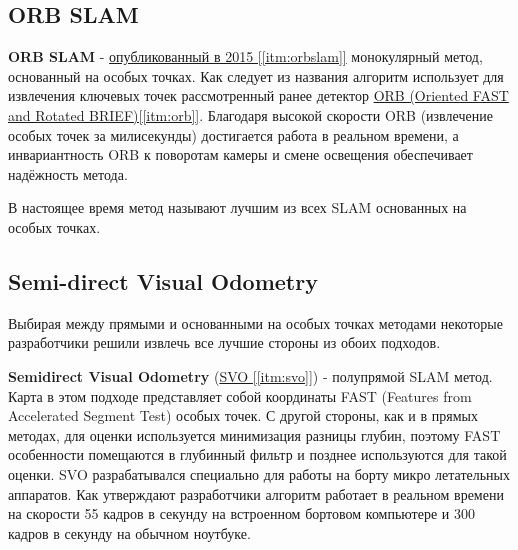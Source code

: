 \subsection{ORB SLAM}
\textbf{ORB SLAM} - \hyperref[itm:orbslam]{опубликованный в 2015 [\ref{itm:orbslam}]} монокулярный метод, основанный на особых точках. Как следует из названия алгоритм использует для извлечения ключевых точек рассмотренный ранее детектор \hyperref[itm:orb]{ORB (Oriented FAST and Rotated BRIEF)[\ref{itm:orb}]}. Благодаря высокой скорости ORB (извлечение особых точек за милисекунды) достигается работа в реальном времени, а инвариантность ORB к поворотам камеры и смене освещения обеспечивает надёжность метода.

В настоящее время метод называют лучшим из всех SLAM основанных на особых точках.

\subsection{Semi-direct Visual Odometry}
Выбирая между прямыми и основанными на особых точках методами некоторые разработчики решили извлечь все лучшие стороны из обоих подходов.

\textbf{Semidirect
Visual Odometry} (\hyperref[itm:svo]{SVO [\ref{itm:svo}]}) - полупрямой SLAM метод. Карта в этом подходе представляет собой координаты FAST (Features from Accelerated Segment Test) особых точек. С другой стороны, как и в прямых методах, для оценки используется минимизация разницы глубин, поэтому FAST особенности помещаются в глубинный фильтр и позднее используются для такой оценки.
SVO разрабатывался специально для работы на борту микро летательных аппаратов. Как утверждают разработчики алгоритм работает в реальном времени на скорости 55 кадров в секунду на встроенном бортовом компьютере и 300 кадров в секунду на обычном ноутбуке.
